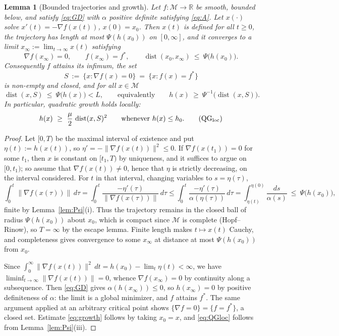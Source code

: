 \documentclass[11pt]{article}
\theoremstyle{plain}
\newtheorem{lem}[thm]{Lemma}
\theoremstyle{definition}
\theoremstyle{remark}
\newcommand{\M}{\mathcal{M}}
\newcommand{\R}{\mathbb{R}}
\DeclareMathOperator{\dist}{dist}
\begin{document}
\begin{lem}[Bounded trajectories and growth]\label{lem:traj}
Let $f\colon\M\to\R$ be smooth, bounded below, and satisfy \eqref{eq:GD} with
$\alpha$ positive definite satisfying \eqref{eq:A}. Let $x(\cdot)$ solve
$x'(t) = -\nabla f(x(t))$, $x(0)=x_0$. Then $x(t)$ is defined for all $t\ge 0$,
the trajectory has length at most $\Psi(h(x_0))$ on $[0,\infty]$, and it
converges to a limit $x_\infty := \lim_{t\to\infty} x(t)$ satisfying
\[
  \nabla f(x_\infty) = 0, \qquad f(x_\infty) = f^*, \qquad
  \dist(x_0, x_\infty) \ \le\ \Psi\bigl(h(x_0)\bigr) .
\]
Consequently $f$ attains its infimum, the set
\[
  S \ :=\ \{x : \nabla f(x)=0\} \ =\ \{x : f(x) = f^*\}
\]
is non-empty and closed, and for all $x\in\M$
\begin{equation}\label{eq:growth}
  \dist(x,S) \ \le\ \Psi\bigl(h(x)\bigr) < L ,
  \qquad\text{equivalently}\qquad
  h(x) \ \ge\ \Psi^{-1}\bigl(\dist(x,S)\bigr) .
\end{equation}
In particular, quadratic growth holds locally:
\begin{equation}\label{eq:QGloc}
  h(x) \ \ge\ \frac{\mu}{2}\,\dist(x,S)^2
  \qquad \text{whenever } h(x) \le h_0 .
  \tag{QG$_{\text{loc}}$}
\end{equation}
\end{lem}

\begin{proof}
Let $[0,T)$ be the maximal interval of existence and put
$\eta(t) := h(x(t))$, so $\eta' = -\|\nabla f(x(t))\|^2 \le 0$. If
$\nabla f(x(t_1))=0$ for some $t_1$, then $x$ is constant on $[t_1,T)$ by
uniqueness, and it suffices to argue on $[0,t_1)$; so assume that
$\nabla f(x(t))\ne 0$, hence that $\eta$ is strictly decreasing, on the
interval considered. For $t$ in that interval, changing variables to $s = \eta(\tau)$,
\[
  \int_0^{t}\|\nabla f(x(\tau))\|\,d\tau
  = \int_0^{t}\frac{-\eta'(\tau)}{\|\nabla f(x(\tau))\|}\,d\tau
  \le \int_0^{t}\frac{-\eta'(\tau)}{\alpha(\eta(\tau))}\,d\tau
  = \int_{\eta(t)}^{\eta(0)}\frac{ds}{\alpha(s)}
  \ \le\ \Psi\bigl(h(x_0)\bigr) ,
\]
finite by Lemma~\ref{lem:Psi}(i). Thus the trajectory remains in the closed ball
of radius $\Psi(h(x_0))$ about $x_0$, which is compact since $\M$ is complete
(Hopf--Rinow), so $T=\infty$ by the escape lemma. Finite length makes $t\mapsto x(t)$
Cauchy, and completeness gives convergence to some $x_\infty$ at distance at most
$\Psi(h(x_0))$ from $x_0$.

Since $\int_0^\infty\|\nabla f(x(t))\|^2\,dt = h(x_0) - \lim_t \eta(t) < \infty$,
we have $\liminf_{t\to\infty}\|\nabla f(x(t))\|=0$, whence
$\nabla f(x_\infty)=0$ by continuity along a subsequence. Then \eqref{eq:GD}
gives $\alpha(h(x_\infty)) \le 0$, so $h(x_\infty)=0$ by positive definiteness
of $\alpha$: the limit is a global minimizer, and $f$ attains $f^*$. The same
argument applied at an arbitrary critical point shows
$\{\nabla f = 0\} = \{f = f^*\}$, a closed set. Estimate \eqref{eq:growth} follows
by taking $x_0 = x$, and \eqref{eq:QGloc} follows from
Lemma~\ref{lem:Psi}(iii).
\end{proof}
\end{document}
